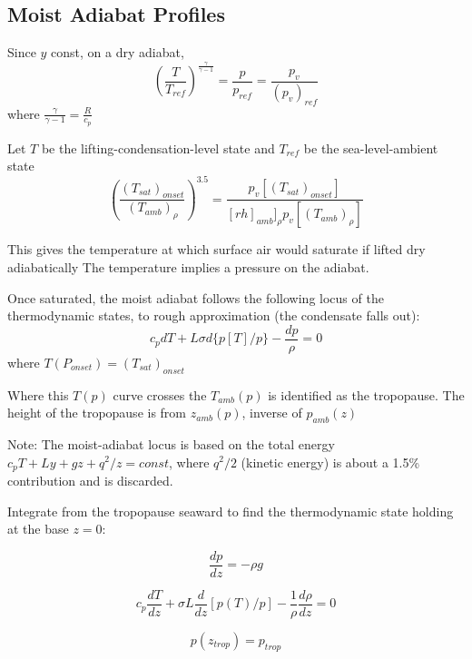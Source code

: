 \documentclass[preprint, prX]{revtex4}
\newcommand{\gogmo}{\frac{\gamma}{\gamma-1}}
\newcommand{\pfrac}[2]{\left(\frac{#1}{#2}\right)}
\newcommand{\dd}[2]{\frac{d#1}{d#2}}
\begin{document}
\subsection{Moist Adiabat Profiles}

Since $y$ const, on a dry adiabat,   
\begin{equation}
	 \pfrac{T}{T_{ref}}^\gogmo = \frac{p}{p_{ref}} = \frac{p_v}{(p_v)_{ref}}
\end{equation}
where $\gogmo = \frac{R}{c_p}$

Let $T$ be the lifting-condensation-level state and $T_{ref}$ be the sea-level-ambient state
\begin{equation}
	 \pfrac{ (T_{sat} )_{onset}  }{ (T_{amb})_{\rho} } ^{3.5} = \frac{ p_v[ (T_{sat})_{onset}]   }{[rh]_{amb}]_\rho p_v[(T_{amb})_\rho]}
\end{equation}


This gives the temperature at which surface air would saturate if lifted dry adiabatically The temperature implies a pressure on the adiabat.

Once saturated, the moist adiabat follows the following locus of the thermodynamic states, to rough approximation (the condensate falls out):
\begin{equation}
	c_p dT + L \sigma d\{ p[T]/p \} - \frac{dp}{\rho} = 0
\end{equation}
where $T(P_{onset} ) = (T_{sat} )_{onset}$

Where this $T(p)$ curve crosses the $T_{amb}(p)$ is identified as the tropopause. The height of the tropopause is from $z_{amb}(p)$, inverse of $p_{amb}(z)$

Note: The moist-adiabat locus is based on the total energy $c_p T + Ly + gz + q^2/z = const$, where $q^2/2$ (kinetic energy) is about a 1.5\% contribution and is discarded.

Integrate from the tropopause seaward to find the thermodynamic state holding at the base $z=0$:

\begin{equation}
	\frac{dp}{dz} = - \rho g
\end{equation}

\begin{equation}
	c_p \dd{T}{z} + \sigma L \dd{}{z} [ p(T) / p] - \frac{1}{\rho} \dd{\rho}{z} = 0
\end{equation}

\begin{equation}
	p(z_{trop}) = p_{trop} 
\end{equation}
\end{document}
